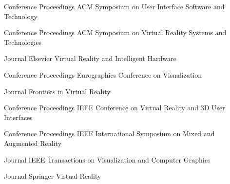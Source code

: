 \begin{cventries}
  \cventry
    {Conference Proceedings} %
    {ACM Symposium on User Interface Software and Technology} %
    {} %
    {} %
    {}
    \vspace{-0.15in}
    
  \cventry
    {Conference Proceedings} %
    {ACM Symposium on Virtual Reality Systems and Technologies} %
    {} %
    {} %
    {}
    \vspace{-0.15in}
    
  \cventry
    {Journal} %
    {Elsevier Virtual Reality and Intelligent Hardware} %
    {} %
    {} %
    {}
    \vspace{-0.15in}
    
  \cventry
    {Conference Proceedings} %
    {Eurographics Conference on Visualization} %
    {} %
    {} %
    {}
    \vspace{-0.15in}
    
  \cventry
    {Journal} %
    {Frontiers in Virtual Reality} %
    {} %
    {} %
    {}
    \vspace{-0.15in}
    
  \cventry
    {Conference Proceedings} %
    {IEEE Conference on Virtual Reality and 3D User Interfaces} %
    {} %
    {} %
    {}
    \vspace{-0.15in}
    
  \cventry
    {Conference Proceedings} %
    {IEEE International Symposium on Mixed and Augmented Reality} %
    {} %
    {} %
    {}
    \vspace{-0.15in}
    
  \cventry
    {Journal} %
    {IEEE Transactions on Visualization and Computer Graphics} %
    {} %
    {} %
    {}
    \vspace{-0.15in}

  \cventry
    {Journal} %
    {Springer Virtual Reality} %
    {} %
    {} %
    {}
    \vspace{-0.15in}

  
\end{cventries}
